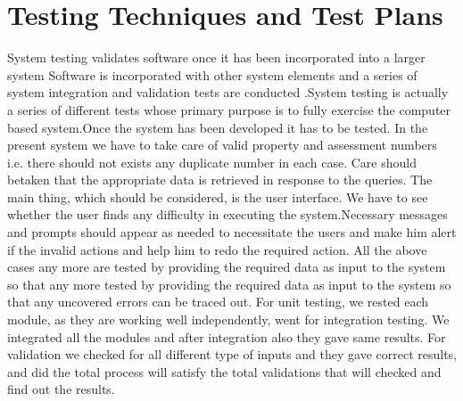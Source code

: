 \section{Testing Techniques and Test Plans} %
\label{sec:testing_techniques_and_test_plans}
System testing validates software once it has been incorporated into a larger system Software is incorporated with other system elements and a series of system integration and validation tests are conducted .System testing is actually a series of different tests whose primary purpose is to fully exercise the computer based system.Once the system has been developed it has to be tested. In the present system we have to take care of valid property and assessment numbers i.e. there should not exists any duplicate number in each case. Care should betaken that the appropriate data is retrieved in response to the queries. The main thing, which should be considered, is the user interface. We have to see whether the user finds any difficulty in executing the system.Necessary messages and prompts should appear as needed to necessitate the users and make him alert if the invalid actions and help him to redo the required action. All the above cases any more are tested by providing the required data as input to the system so that any more tested by providing the required data as input to the system so that any uncovered errors can be traced out. For unit testing, we rested each module, as they are working well independently, went for integration testing. We integrated all the modules and after integration also they gave same results. For validation we checked for all different type of inputs and they gave correct results, and did the total process will satisfy the total validations that will checked and find out the results.
